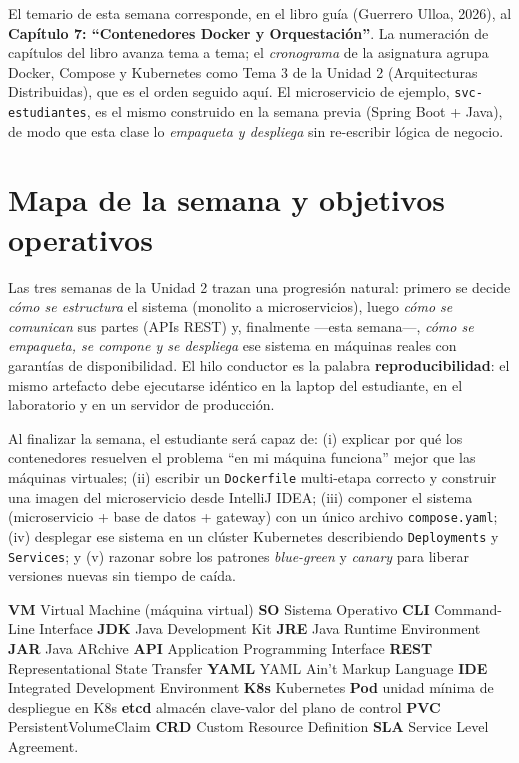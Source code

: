 \documentclass[11pt,a4paper]{article}
\begin{document}
\begin{warnbox}
El temario de esta semana corresponde, en el libro gu\'ia (Guerrero Ulloa, 2026), al \textbf{Cap\'itulo 7: ``Contenedores Docker y Orquestaci\'on''}. La numeraci\'on de cap\'itulos del libro avanza tema a tema; el \emph{cronograma} de la asignatura agrupa Docker, Compose y Kubernetes como Tema 3 de la Unidad 2 (Arquitecturas Distribuidas), que es el orden seguido aqu\'i. El microservicio de ejemplo, \texttt{svc-estudiantes}, es el mismo construido en la semana previa (Spring Boot + Java), de modo que esta clase lo \emph{empaqueta y despliega} sin re-escribir l\'ogica de negocio.
\end{warnbox}

\section{Mapa de la semana y objetivos operativos}

Las tres semanas de la Unidad 2 trazan una progresi\'on natural: primero se decide \emph{c\'omo se estructura} el sistema (monolito a microservicios), luego \emph{c\'omo se comunican} sus partes (APIs REST) y, finalmente ---esta semana---, \emph{c\'omo se empaqueta, se compone y se despliega} ese sistema en m\'aquinas reales con garant\'ias de disponibilidad. El hilo conductor es la palabra \textbf{reproducibilidad}: el mismo artefacto debe ejecutarse id\'entico en la laptop del estudiante, en el laboratorio y en un servidor de producci\'on.

Al finalizar la semana, el estudiante ser\'a capaz de: (i) explicar por qu\'e los contenedores resuelven el problema ``en mi m\'aquina funciona'' mejor que las m\'aquinas virtuales; (ii) escribir un \texttt{Dockerfile} multi-etapa correcto y construir una imagen del microservicio desde IntelliJ IDEA; (iii) componer el sistema (microservicio + base de datos + gateway) con un \'unico archivo \texttt{compose.yaml}; (iv) desplegar ese sistema en un cl\'uster Kubernetes describiendo \texttt{Deployments} y \texttt{Services}; y (v) razonar sobre los patrones \emph{blue-green} y \emph{canary} para liberar versiones nuevas sin tiempo de ca\'ida.

\begin{ideabox}
\textbf{VM} Virtual Machine (m\'aquina virtual) \textbullet{} \textbf{SO} Sistema Operativo \textbullet{} \textbf{CLI} Command-Line Interface \textbullet{} \textbf{JDK} Java Development Kit \textbullet{} \textbf{JRE} Java Runtime Environment \textbullet{} \textbf{JAR} Java ARchive \textbullet{} \textbf{API} Application Programming Interface \textbullet{} \textbf{REST} Representational State Transfer \textbullet{} \textbf{YAML} YAML Ain't Markup Language \textbullet{} \textbf{IDE} Integrated Development Environment \textbullet{} \textbf{K8s} Kubernetes \textbullet{} \textbf{Pod} unidad m\'inima de despliegue en K8s \textbullet{} \textbf{etcd} almac\'en clave-valor del plano de control \textbullet{} \textbf{PVC} PersistentVolumeClaim \textbullet{} \textbf{CRD} Custom Resource Definition \textbullet{} \textbf{SLA} Service Level Agreement.
\end{ideabox}
\end{document}

